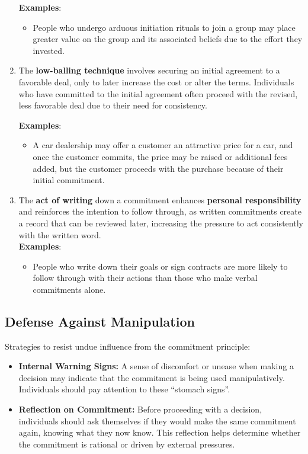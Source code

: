 \begin{enumerate}
    \textbf{Examples}:
    \begin{itemize}
        \item People who undergo arduous initiation rituals to join a group may place greater value on the group and its associated beliefs due to the effort they invested.
    \end{itemize}
    \item The \textbf{low-balling technique} involves securing an initial agreement to a favorable deal, only to later increase the cost or alter the terms. Individuals who have committed to the initial agreement often proceed with the revised, less favorable deal due to their need for consistency.

    \textbf{Examples}:
    \begin{itemize}
        \item A car dealership may offer a customer an attractive price for a car, and once the customer commits, the price may be raised or additional fees added, but the customer proceeds with the purchase because of their initial commitment.
    \end{itemize}
    \item The \textbf{act of writing} down a commitment enhances \textbf{personal responsibility} and reinforces the intention to follow through, as written commitments create a record that can be reviewed later, increasing the pressure to act consistently with the written word.\\
    \textbf{Examples}:
    \begin{itemize}
        \item People who write down their goals or sign contracts are more likely to follow through with their actions than those who make verbal commitments alone.
    \end{itemize}
\end{enumerate}


\subsection*{Defense Against Manipulation}
Strategies to resist undue influence from the commitment principle:
\begin{itemize}
    \item \textbf{Internal Warning Signs:} A sense of discomfort or unease when making a decision may indicate that the commitment is being used manipulatively. Individuals should pay attention to these ``stomach signs''.
    \item \textbf{Reflection on Commitment:} Before proceeding with a decision, individuals should ask themselves if they would make the same commitment again, knowing what they now know. This reflection helps determine whether the commitment is rational or driven by external pressures.
\end{itemize}

